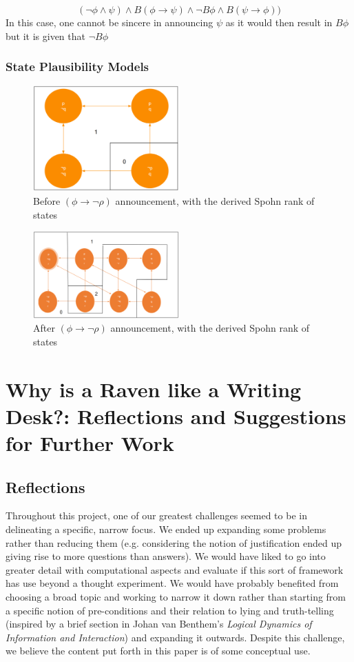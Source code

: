 \documentclass[12pt, titlepage, twoside, a4paper]{report}
\begin{document}
$$(\neg \phi \wedge \psi) \wedge B(\phi \to \psi) \wedge \neg B \phi \wedge B(\psi \to \phi))$$
In this case, one cannot be sincere in announcing $\psi$ as it would then result in $B\phi$ but it is given that $\neg B \phi$
\newpage
\subsection{State Plausibility Models}
\quad
\newline
\begin{figure}[h!]
  \centering
  \includegraphics[width=0.5\textwidth]{slide34.eps}
  \caption{Before $(\phi \to \neg \rho)$ announcement, with the derived Spohn rank of states}
\end{figure}
\begin{figure}[h!]
  \centering
  \includegraphics[width=0.5\textwidth]{slide36.eps}
  \caption{After $(\phi \to \neg \rho)$ announcement, with the derived Spohn rank of states}
\end{figure}
\quad
\newline

\chapter{Why is a Raven like a Writing Desk?: Reflections and Suggestions for Further Work}
\section{Reflections}
Throughout this project, one of our greatest challenges seemed to be in delineating a specific, narrow focus. We ended up expanding some problems rather than reducing them (e.g. considering the notion of justification ended up giving rise to more questions than answers). We would have liked to go into greater detail with computational aspects and evaluate if this sort of framework has use beyond a thought experiment. We would have probably benefited from choosing a broad topic and working to narrow it down rather than starting from a specific notion of pre-conditions and their relation to lying and truth-telling (inspired by a brief section in Johan van Benthem's \textit{Logical Dynamics of Information and Interaction})\autocite{BenthemJohanvan2011Ldoi} and expanding it outwards. Despite this challenge, we believe the content put forth in this paper is of some conceptual use.
\newpage
\end{document}
